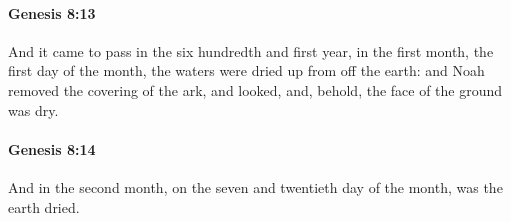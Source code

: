 		\paragraph{Genesis 8:13} %
			\label{GENESIS-8-13}

			And it came to pass in the six hundredth and first year, in the first month, the first day of the month, the waters were dried up from off the earth: and Noah removed the covering of the ark, and looked, and, behold, the face of the ground was dry.


		\paragraph{Genesis 8:14} %
			\label{GENESIS-8-14}

			And in the second month, on the seven and twentieth day of the month, was the earth dried.


